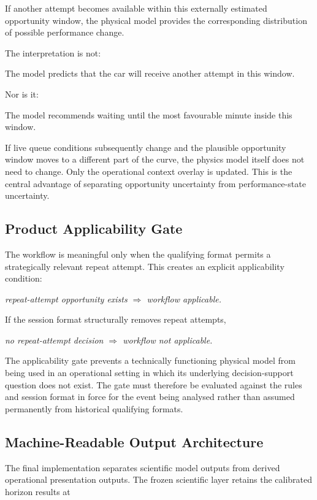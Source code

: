 If another attempt becomes available within this externally estimated opportunity window, the physical model provides the corresponding distribution of possible performance change.

The interpretation is not:

The model predicts that the car will receive another attempt in this window.

Nor is it:

The model recommends waiting until the most favourable minute inside this window.

If live queue conditions subsequently change and the plausible opportunity window moves to a different part of the curve, the physics model itself does not need to change. Only the operational context overlay is updated. This is the central advantage of separating opportunity uncertainty from performance-state uncertainty.

\subsection{Product Applicability Gate}
The workflow is meaningful only when the qualifying format permits a strategically relevant repeat attempt. This creates an explicit applicability condition:

\begin{center}\textit{repeat-attempt opportunity exists \ensuremath{\Rightarrow} workflow applicable.}\end{center}

If the session format structurally removes repeat attempts,

\begin{center}\textit{no repeat-attempt decision \ensuremath{\Rightarrow} workflow not applicable.}\end{center}

The applicability gate prevents a technically functioning physical model from being used in an operational setting in which its underlying decision-support question does not exist. The gate must therefore be evaluated against the rules and session format in force for the event being analysed rather than assumed permanently from historical qualifying formats.

\subsection{Machine-Readable Output Architecture}
The final implementation separates scientific model outputs from derived operational presentation outputs. The frozen scientific layer retains the calibrated horizon results at

